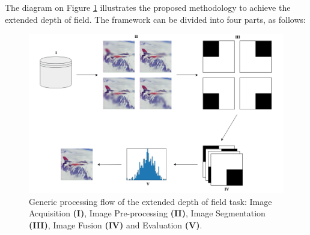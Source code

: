 The diagram on Figure \ref{fig:processing_flow} illustrates the proposed methodology to achieve the extended depth of field. The framework can be divided into four parts, as follows:

\begin{figure}[H]
	\centering
	\caption{\label{fig:processing_flow}Generic processing flow of the extended depth of field task: Image Acquisition \textbf{(I)}, Image Pre-processing \textbf{(II)}, Image Segmentation \textbf{(III)}, Image Fusion \textbf{(IV)} and Evaluation \textbf{(V)}.}
	\begin{center}
	    \includegraphics[scale=0.35, trim = {0 0.3cm 0 2cm}]{images/fig12.png}
	\end{center}
	\centering
    \fautor
\end{figure}

